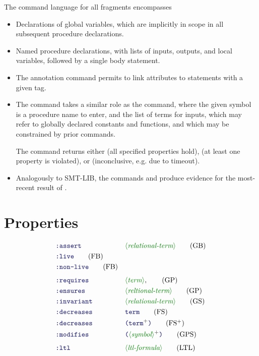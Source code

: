 \documentclass[runningheads]{llncs}
\begin{document}
\noindent
The command language for all fragments encompasses
\begin{itemize}
\item Declarations of global variables,
      which are implicitly in scope in all subsequent procedure declarations.
\item Named procedure declarations,
      with lists of inputs, outputs, and local variables,
      followed by a single body statement.
\item The annotation command permits to link attributes
      to statements with a given tag.
\item The  command takes a similar role as the  command,
      where the given symbol is a procedure name to enter,
      and the list of terms for inputs,
      which may refer to globally declared constants and functions,
      and which may be constrained by prior  commands.

      The command returns either  (all specified properties hold),
       (at least one property is violated),
      or  (inconclusive, e.g. due to timeout).
\item Analogously to SMT-LIB, the commands 
      and  produce evidence
      for the most-recent result of .
\end{itemize}

\section{Properties}

\begin{align}
& \terminal{:assert}
    && \nonterminal{relational-term}
    \tag{GB} \\
& \terminal{:live}
    \tag{FB} \\
& \terminal{:non-live}
    \tag{FB} \\[4pt]
& \terminal{:requires}
    && \nonterminal{term},
    \tag{GP} \\
& \terminal{:ensures}
    && \nonterminal{reltional-term}
    \tag{GP} \\
& \terminal{:invariant}
    && \nonterminal{relational-term}
    \tag{GS} \\
& \terminal{:decreases}
    && \terminal{term}
    \tag{FS} \\
& \terminal{:decreases}
    && \LP \terminal{term}\rplus \RP
    \tag{FS$^+$} \\
& \terminal{:modifies}
    && \LP \nonterminal{symbol}\rplus \RP
    \tag{GPS} \\[4pt]
& \terminal{:ltl}
    && \nonterminal{ltl-formula}
    \tag{LTL}
\end{align}
\end{document}
